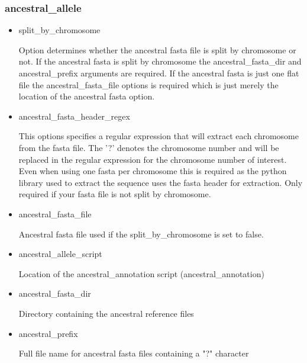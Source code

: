 \documentclass[a4paper,10pt]{article}
\begin{document}
                             \subsubsection{ancestral\_allele}
                             \begin{itemize}
                             \item split\_by\_chromosome

                             Option determines whether the ancestral fasta file is split by
                             chromosome or not. If the ancestral fasta is split by chromosome the
                             ancestral\_fasta\_dir and ancestral\_prefix arguments are required. If
                             the ancestral fasta is just one flat file the ancestral\_fasta\_file
                             options is required which is just merely the location of the ancestral
                             fasta option.

                             \item ancestral\_fasta\_header\_regex

                             This options specifies a regular expression that will extract each
                             chromosome from the fasta file. The '?' denotes the chromosome number
                             and will be replaced in the regular expression for the chromosome
                             number of interest. Even when using one fasta per chromosome this is
                             required as the python library used to extract the sequence uses the
                             fasta header for extraction. Only required if your fasta file is not
                             split by chromosome.

                             \item ancestral\_fasta\_file

                             Ancestral fasta file used if the split\_by\_chromosome is set to false.

                             \item ancestral\_allele\_script

                             Location of the ancestral\_annotation script (ancestral\_annotation)
                             \item ancestral\_fasta\_dir 

                             Directory containing the ancestral reference files
                             \item ancestral\_prefix 

                             Full file name for ancestral fasta files containing a "?" character

                             \end{itemize}
\end{document}
